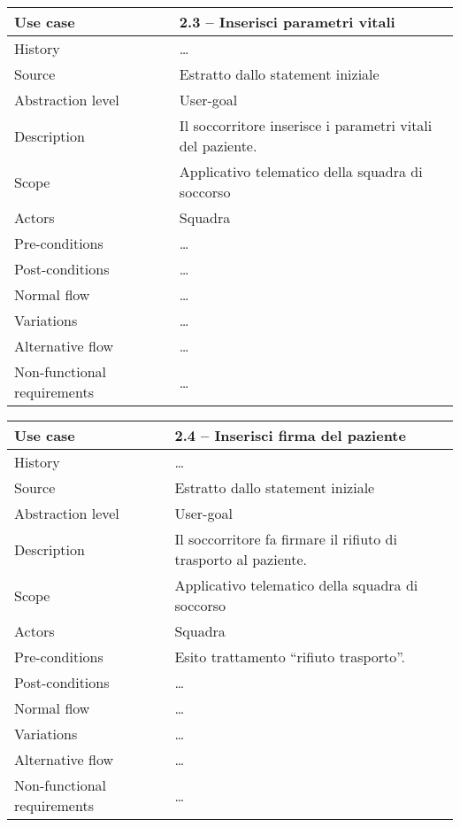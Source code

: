 \documentclass{article}
\begin{document}
    \begin{table}
        \begin{tabularx}{\textwidth}{l|X}
            Use case & 2.3 – Inserisci parametri vitali\\
            \hline
            History & \dots \\
            Source & Estratto dallo statement iniziale\\
            Abstraction level & User-goal\\
            Description & Il soccorritore inserisce i parametri vitali del paziente.\\
            Scope & Applicativo telematico della squadra di soccorso\\
            Actors & Squadra\\
            Pre-conditions & \dots \\
            Post-conditions & \dots \\
            Normal flow & \dots \\
            Variations & \dots \\
            Alternative flow & \dots \\
            Non-functional requirements & \dots
        \end{tabularx}
        \label{tab:usecase2.3}
    \end{table}

    \begin{table}
        \begin{tabularx}{\textwidth}{l|X}
            Use case & \textbf{2.4 – Inserisci firma del paziente}\\
            \hline
            History & \dots \\
            Source & Estratto dallo statement iniziale\\
            Abstraction level & User-goal\\
            Description & Il soccorritore fa firmare il rifiuto di trasporto al paziente.\\
            Scope & Applicativo telematico della squadra di soccorso\\
            Actors & Squadra\\
            Pre-conditions & Esito trattamento “rifiuto trasporto”. \\
            Post-conditions & \dots \\
            Normal flow & \dots \\
            Variations & \dots \\
            Alternative flow & \dots \\
            Non-functional requirements & \dots
        \end{tabularx}
        \label{tab:usecase2.4}
    \end{table}
\end{document}
